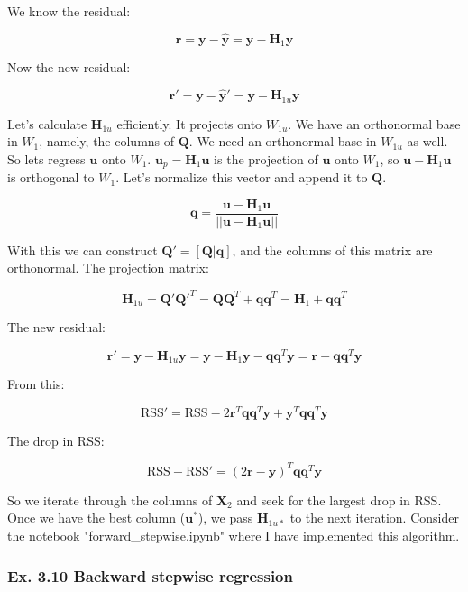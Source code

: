 \documentclass{article}
\begin{document}
We know the residual:

\[
\mathbf{r} = \mathbf{y} - \mathbf{\hat{y}} = \mathbf{y} - \mathbf{H}_1 \mathbf{y}
\]

Now the new residual:

\[
\mathbf{r}'  = \mathbf{y} - \mathbf{\hat{y}}' = \mathbf{y} - \mathbf{H}_{1u}\mathbf{y}
\]

Let's calculate $\mathbf{H}_{1u}$ efficiently. It projects onto $W_{1u}$. We have an orthonormal base in $W_1$, namely, the columns of $\mathbf{Q}$. We need an orthonormal base in $W_{1u}$ as well. So lets regress $\mathbf{u}$ onto $W_1$. $\mathbf{u}_p = \mathbf{H}_1 \mathbf{u}$ is the projection of $\mathbf{u}$ onto $W_1$, so $\mathbf{u} - \mathbf{H}_1 \mathbf{u}$ is orthogonal to $W_1$. Let's normalize this vector and append it to $\mathbf{Q}$.

\[
    \mathbf{q} = \frac{\mathbf{u} - \mathbf{H}_1 \mathbf{u}}{|| \mathbf{u} - \mathbf{H}_1 \mathbf{u} ||}
\]

With this we can construct $\mathbf{Q}' = [\mathbf{Q} | \mathbf{q}]$, and the columns of this matrix are orthonormal. The projection matrix:

\[
\mathbf{H}_{1u} = \mathbf{Q}'\mathbf{Q}'^T = \mathbf{Q}\mathbf{Q}^T + \mathbf{q}\mathbf{q}^T = \mathbf{H}_1 + \mathbf{q}\mathbf{q}^T
\]

The new residual:

\[
\mathbf{r}' = \mathbf{y} - \mathbf{H}_{1u}\mathbf{y} = \mathbf{y} - \mathbf{H}_1 \mathbf{y} - \mathbf{q}\mathbf{q}^T\mathbf{y} = \mathbf{r} - \mathbf{q}\mathbf{q}^T\mathbf{y}
\]

From this:

\[
\text{RSS}' = \text{RSS} -2\mathbf{r}^T \mathbf{q}\mathbf{q}^T \mathbf{y} + \mathbf{y}^T\mathbf{q}\mathbf{q}^T\mathbf{y}
\]

The drop in RSS:

\[
\text{RSS} - \text{RSS}' = (2\mathbf{r} - \mathbf{y})^T\mathbf{q}\mathbf{q}^T\mathbf{y}
\]

So we iterate through the columns of $\mathbf{X}_2$ and seek for the largest drop in RSS. Once we have the best column ($\mathbf{u}^{*}$), we pass $\mathbf{H}_{1u*}$ to the next iteration. Consider the notebook "forward\_stepwise.ipynb" where I have implemented this algorithm.

\subsubsection{Ex. 3.10 Backward stepwise regression}
\end{document}
